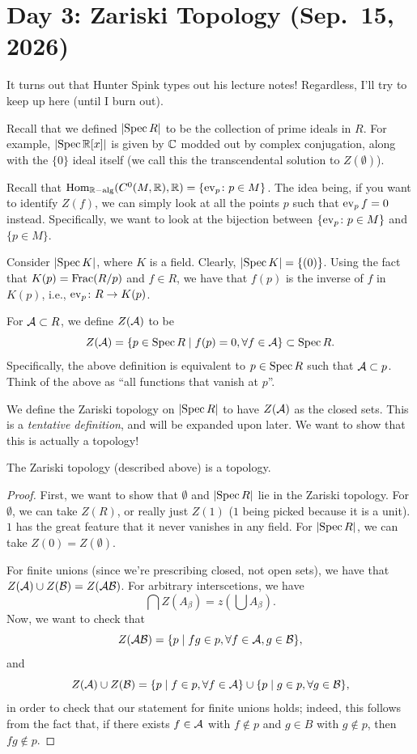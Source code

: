\section{Day 3: Zariski Topology (Sep.\ 15, 2026)}
It turns out that Hunter Spink types out his lecture notes! Regardless, I'll try to keep up here (until I burn out).

Recall that we defined $\left\lvert \operatorname{Spec} R \right\rvert$ to be the collection of prime ideals in $R$. For example, $\left\lvert \operatorname{Spec} \mathbb R[x] \right\rvert$ is given by $\mathbb C$ modded out by complex conjugation, along with the $\{0\}$ ideal itself (we call this the transcendental solution to $Z(\emptyset)$).

Recall that $\operatorname{Hom}_{\mathbb R-\operatorname{alg}}(C^0(M, \mathbb R), \mathbb R) = \{\operatorname{ev}_p \colon p \in M\}$. The idea being, if you want to identify $Z(f)$, we can simply look at all the points $p$ such that $\operatorname{ev}_p f = 0$ instead. Specifically, we want to look at the bijection between $\{\operatorname{ev}_p \colon p \in M\}$ and $\{p \in M\}$.

Consider $\left\lvert \operatorname{Spec} K \right\rvert$, where $K$ is a field. Clearly, $\left\lvert \operatorname{Spec} K \right\rvert = \{(0)\}$. Using the fact that $K(p) = \operatorname{Frac}(R/p)$ and $f \in R$, we have that $f(p)$ is the inverse of $f$ in $K(p)$, i.e., $\operatorname{ev}_p \colon R \to K(p)$.

\begin{definition}
    For $\mathcal A \subset R$, we define $Z(\mathcal A)$ to be
    \[ Z(\mathcal A) = \{p \in \operatorname{Spec} R \mid f(p) = 0, \forall f \in \mathcal A\} \subset \operatorname{Spec} R. \]
    Specifically, the above definition is equivalent to $p \in \operatorname{Spec} R$ such that $\mathcal A \subset p$. Think of the above as ``all functions that vanish at $p$''.
\end{definition}
We define the Zariski topology on $\left\lvert \operatorname{Spec} R \right\rvert$ to have $Z(\mathcal A)$ as the closed sets. This is a \textit{tentative definition}, and will be expanded upon later. We want to show that this is actually a topology!

\begin{theorem} \label{thm:Zariski_topology}
    The Zariski topology (described above) is a topology.
\end{theorem}
\begin{proof}
    First, we want to show that $\emptyset$ and $\left\lvert \operatorname{Spec} R \right\rvert$ lie in the Zariski topology. For $\emptyset$, we can take $Z(R)$, or really just $Z(1)$ ($1$ being picked because it is a unit). $1$ has the great feature that it never vanishes in any field. For $\left\lvert \operatorname{Spec} R \right\rvert$, we can take $Z(0) = Z(\emptyset)$.

    For finite unions (since we're prescribing closed, not open sets), we have that $Z(\mathcal A) \cup Z(\mathcal B) = Z(\mathcal A \mathcal B)$. For arbitrary interscetions, we have
    \[ \bigcap Z(A_\beta) = z\left(\bigcup A_\beta\right). \]
    Now, we want to check that
    \[ Z(\mathcal A \mathcal B) = \{p \mid fg \in p, \forall f \in \mathcal A, g \in \mathcal B\}, \]
    and
    \[ Z(\mathcal A) \cup Z(\mathcal B) = \{p \mid f \in p, \forall f \in \mathcal A\} \cup \{p \mid g \in p, \forall g \in \mathcal B\}, \]
    in order to check that our statement for finite unions holds; indeed, this follows from the fact that, if there exists $f \in \mathcal A$ with $f \notin p$ and $g \in B$ with $g \notin p$, then $fg \notin p$.
\end{proof}

